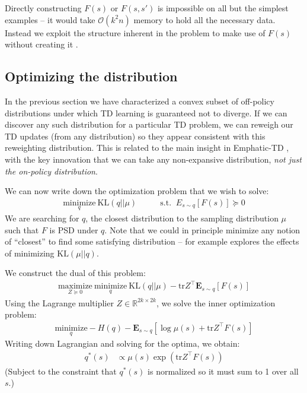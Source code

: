 \documentclass[11pt]{article}
\newcommand{\E}{\textbf{E}}
\newcommand{\tr}{\text{tr}}
\begin{document}
Directly constructing $F(s)$ or $F(s, s')$ is impossible on all but the simplest examples -- it would take $\mathcal O(k^2n)$ memory to hold all the necessary data. Instead we exploit the structure inherent in the problem to make use of $F(s)$ without creating it .


\subsection{Optimizing the distribution}

In the previous section we have characterized a convex subset of off-policy distributions under which TD learning is guaranteed not to diverge. If we can discover any such distribution for a particular TD problem, we can reweigh our TD updates (from any distribution) so they appear consistent with this reweighting distribution. This is related to the main insight in Emphatic-TD \cite{sutton2016emphatic}, with the key innovation that we can take any non-expansive distribution, \emph{not just the on-policy distribution}.

We can now write down the optimization problem that we wish to solve: 
\begin{align}
  \underset{q}{\text{minimize}}~\text{KL}(q||\mu) & \qquad \text{s.t. } ~ E_{s\sim q}[F(s)] \succcurlyeq 0
\end{align}
We are searching for $q$, the closest distribution to the sampling distribution $\mu$ such that $F$ is PSD under $q$. Note that we could in principle minimize any notion of ``closest'' to find some satisfying distribution -- for example \citet{kolter2011fixed} explores the effects of minimizing $\text{KL}(\mu||q)$.

We construct the dual of this problem:
\begin{align}
  \underset{Z\succcurlyeq 0}{\text{maximize}}~ \underset{q}{\text{minimize}}~\text{KL}(q||\mu) - \tr Z^\top \E_{s\sim q}[F(s)]
\end{align}
Using the Lagrange multiplier $Z\in\mathbb R^{2k\times 2k}$, we solve the inner optimization problem:
\begin{align}
  \underset{q}{\text{minimize}} - H(q) - \E_{s\sim q}[\log \mu(s) + \tr Z^\top F(s)]
\end{align}
Writing down Lagrangian and solving for the optima, we obtain:
\begin{align}
  q^*(s) & \propto \mu(s)\exp( \tr Z^\top F(s))
\end{align}
(Subject to the constraint that $q^*(s)$ is normalized so it must sum to 1 over all $s$.)
\end{document}
